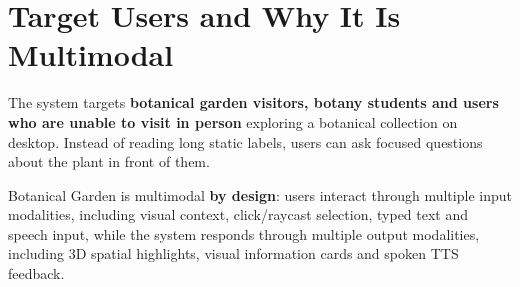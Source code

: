 \documentclass[12pt,a4paper]{article}
\begin{document}
\section{Target Users and Why It Is Multimodal}
The system targets \textbf{botanical garden visitors, botany students and users who are unable to visit in person} exploring a botanical collection on desktop. Instead of reading long static labels, users can ask focused questions about the plant in front of them.

Botanical Garden is multimodal \textbf{by design}: users interact through
multiple input modalities, including visual context, click/raycast selection,
typed text and speech input, while the system responds through multiple output
modalities, including 3D spatial highlights, visual information cards and
spoken TTS feedback. 
\end{document}
